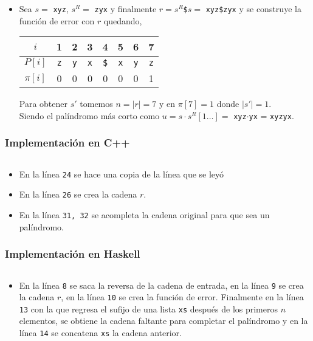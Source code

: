 \begin{itemize}
\item Sea $s = $ \texttt{xyz}, $s^R =$ \texttt{zyx} y finalmente
$r = s^R$\texttt{\$}$s =$ \texttt{xyz\$zyx} y se construye la función de error con $r$ quedando,

\begin{table}[H]
\centering
\begin{tabular}{c|c|c|c|c|c|c|c|}
\cline{2-8}
$i$      & 1          & 2          & 3          & 4           & 5          & 6          & 7          \\ \hline
$P[i]$   & \texttt{z} & \texttt{y} & \texttt{x} & \texttt{\$} & \texttt{x} & \texttt{y} & \texttt{z} \\ \hline
$\pi[i]$ & 0          & 0          & 0          & 0           & 0          & 0          & 1          \\ \cline{2-8} 
\end{tabular}
\end{table}
Para obtener $s'$ tomemos $n = \vert r \vert = 7$ y en $\pi[7] = 1$ donde $\vert s' \vert = 1$.\\
Siendo el palíndromo más corto como
$u = s \cdot s^R[1 \ldots] =$ \texttt{xyz}$\cdot$\texttt{yx} = \texttt{xyzyx}.

\end{itemize}



\subsubsection{Implementación en C++}
\inputminted[linenos, frame=lines]{cpp}{problemas/cpp/EPALIN.cpp}

\begin{itemize}
\item En la línea \texttt{24} se hace una copia de la línea que se leyó
\item En la línea \texttt{26} se crea la cadena $r$.
\item En la línea \texttt{31, 32} se acompleta la cadena original para que sea un palíndromo.
\end{itemize}

\subsubsection{Implementación en Haskell}
\inputminted[linenos, frame=lines]{haskell}{problemas/haskell/EPALIN.hs}

\begin{itemize}
\item En la línea \texttt{8} se saca la reversa de la cadena de entrada, en la línea \texttt{9}
se crea la cadena $r$, en la línea \texttt{10} se crea la función de error. Finalmente en la línea
\texttt{13} con la  que regresa el sufijo de una lista
\texttt{xs} después de los primeros $n$ elementos, se obtiene la cadena faltante para completar el
palíndromo y en la línea \texttt{14} se concatena \texttt{xs} la cadena anterior.
\end{itemize}

